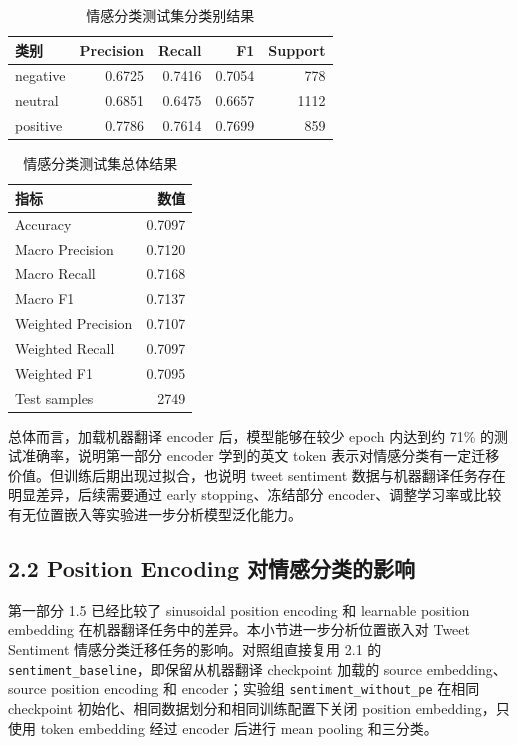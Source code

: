 ﻿\documentclass[UTF8,a4paper,12pt]{ctexart}
\begin{document}
\begin{table}[H]
\centering
\caption{情感分类测试集分类别结果}
\label{tab:sentiment-class-test}
\begin{tabular}{lrrrr}
\toprule
类别 & Precision & Recall & F1 & Support \\
\midrule
negative & 0.6725 & 0.7416 & 0.7054 & 778 \\
neutral & 0.6851 & 0.6475 & 0.6657 & 1112 \\
positive & 0.7786 & 0.7614 & 0.7699 & 859 \\
\bottomrule
\end{tabular}
\end{table}

\begin{table}[H]
\centering
\caption{情感分类测试集总体结果}
\label{tab:sentiment-overall-test}
\begin{tabular}{lr}
\toprule
指标 & 数值 \\
\midrule
Accuracy & 0.7097 \\
Macro Precision & 0.7120 \\
Macro Recall & 0.7168 \\
Macro F1 & 0.7137 \\
Weighted Precision & 0.7107 \\
Weighted Recall & 0.7097 \\
Weighted F1 & 0.7095 \\
Test samples & 2749 \\
\bottomrule
\end{tabular}
\end{table}

总体而言，加载机器翻译 encoder 后，模型能够在较少 epoch 内达到约 71\% 的测试准确率，说明第一部分 encoder 学到的英文 token 表示对情感分类有一定迁移价值。但训练后期出现过拟合，也说明 tweet sentiment 数据与机器翻译任务存在明显差异，后续需要通过 early stopping、冻结部分 encoder、调整学习率或比较有无位置嵌入等实验进一步分析模型泛化能力。

\subsection{2.2 Position Encoding 对情感分类的影响}

第一部分 1.5 已经比较了 sinusoidal position encoding 和 learnable position embedding 在机器翻译任务中的差异。本小节进一步分析位置嵌入对 Tweet Sentiment 情感分类迁移任务的影响。对照组直接复用 2.1 的 \texttt{sentiment\_baseline}，即保留从机器翻译 checkpoint 加载的 source embedding、source position encoding 和 encoder；实验组 \texttt{sentiment\_without\_pe} 在相同 checkpoint 初始化、相同数据划分和相同训练配置下关闭 position embedding，只使用 token embedding 经过 encoder 后进行 mean pooling 和三分类。
\end{document}
